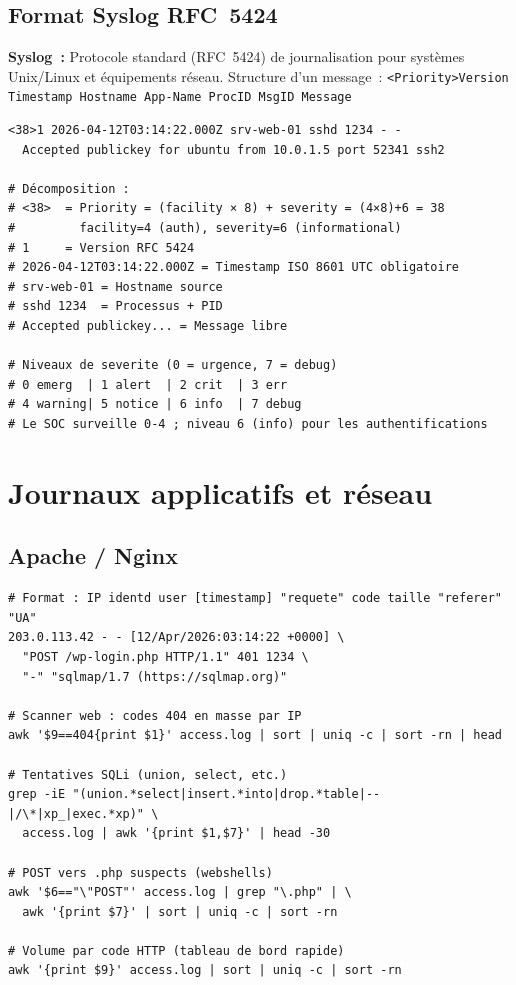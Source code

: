 \subsection{Format Syslog RFC~5424}

\begin{boxdef}
\textbf{Syslog~:} Protocole standard (RFC~5424) de journalisation pour systèmes
Unix/Linux et équipements réseau. Structure d'un message~:
\texttt{<Priority>Version Timestamp Hostname App-Name ProcID MsgID Message}
\end{boxdef}

\begin{lstlisting}[style=StyleTerminal,
  caption={Anatomie d'un message Syslog RFC~5424},
  label={lst:syslog-format}]
<38>1 2026-04-12T03:14:22.000Z srv-web-01 sshd 1234 - -
  Accepted publickey for ubuntu from 10.0.1.5 port 52341 ssh2

# Décomposition :
# <38>  = Priority = (facility × 8) + severity = (4×8)+6 = 38
#         facility=4 (auth), severity=6 (informational)
# 1     = Version RFC 5424
# 2026-04-12T03:14:22.000Z = Timestamp ISO 8601 UTC obligatoire
# srv-web-01 = Hostname source
# sshd 1234  = Processus + PID
# Accepted publickey... = Message libre

# Niveaux de severite (0 = urgence, 7 = debug)
# 0 emerg  | 1 alert  | 2 crit  | 3 err
# 4 warning| 5 notice | 6 info  | 7 debug
# Le SOC surveille 0-4 ; niveau 6 (info) pour les authentifications
\end{lstlisting}

\section{Journaux applicatifs et réseau}
\label{sec:logs-app}

\subsection{Apache / Nginx}

\begin{lstlisting}[style=StyleTerminal,
  caption={Format Combined Log Apache et analyse sécurité},
  label={lst:apache-log}]
# Format : IP identd user [timestamp] "requete" code taille "referer" "UA"
203.0.113.42 - - [12/Apr/2026:03:14:22 +0000] \
  "POST /wp-login.php HTTP/1.1" 401 1234 \
  "-" "sqlmap/1.7 (https://sqlmap.org)"

# Scanner web : codes 404 en masse par IP
awk '$9==404{print $1}' access.log | sort | uniq -c | sort -rn | head

# Tentatives SQLi (union, select, etc.)
grep -iE "(union.*select|insert.*into|drop.*table|--|/\*|xp_|exec.*xp)" \
  access.log | awk '{print $1,$7}' | head -30

# POST vers .php suspects (webshells)
awk '$6=="\"POST"' access.log | grep "\.php" | \
  awk '{print $7}' | sort | uniq -c | sort -rn

# Volume par code HTTP (tableau de bord rapide)
awk '{print $9}' access.log | sort | uniq -c | sort -rn
\end{lstlisting}

